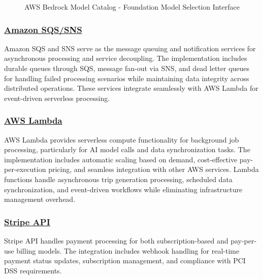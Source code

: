 \begin{figure}[H]
    \centering
    \caption{AWS Bedrock Model Catalog - Foundation Model Selection Interface}
    \label{fig:aws-bedrock-model-catalog}
\end{figure}

\subsubsection*{\underline{Amazon SQS/SNS}}
Amazon SQS and SNS serve as the message queuing and notification services for asynchronous processing and service decoupling. The implementation includes durable queues through SQS, message fan-out via SNS, and dead letter queues for handling failed processing scenarios while maintaining data integrity across distributed operations. These services integrate seamlessly with AWS Lambda for event-driven serverless processing.

\subsubsection*{\underline{AWS Lambda}}
AWS Lambda provides serverless compute functionality for background job processing, particularly for AI model calls and data synchronization tasks. The implementation includes automatic scaling based on demand, cost-effective pay-per-execution pricing, and seamless integration with other AWS services. Lambda functions handle asynchronous trip generation processing, scheduled data synchronization, and event-driven workflows while eliminating infrastructure management overhead.

\subsubsection*{\underline{Stripe API}}
Stripe API handles payment processing for both subscription-based and pay-per-use billing models. The integration includes webhook handling for real-time payment status updates, subscription management, and compliance with PCI DSS requirements.

